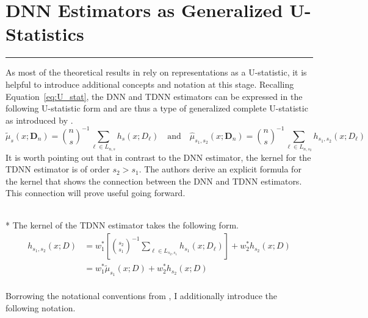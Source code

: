 \section{DNN Estimators as Generalized U-Statistics}\label{sec:U_stat}
\hrule

As most of the theoretical results in \citet{demirkaya_optimal_2024} rely on representations as a U-statistic, it is helpful to introduce additional concepts and notation at this stage.
Recalling Equation~\ref{eq:U_stat}, the DNN and TDNN estimators can be expressed in the following U-statistic form and are thus a type of generalized complete U-statistic as introduced by \citet{peng_rates_2022}.
\begin{equation}
	\tilde{\mu}_{s}(x; \mathbf{D}_n)
	= \binom{n}{s}^{-1} \sum_{\ell \in L_{n,s}} h_{s}(x; D_{\ell})
	\quad \text{and} \quad
	\hat{\mu}_{s_1, s_2}(x; \mathbf{D}_n)
	= \binom{n}{s}^{-1} \sum_{\ell \in L_{n,s_2}} h_{s_1, s_2}(x; D_{\ell})
\end{equation}
It is worth pointing out that in contrast to the DNN estimator, the kernel for the TDNN estimator is of order $s_2 > s_1$.
The authors derive an explicit formula for the kernel that shows the connection between the DNN and TDNN estimators.
This connection will prove useful going forward.
\begin{boxD}
	\begin{lem}\label{lem:dem8}\mbox{}\\*
		The kernel of the TDNN estimator takes the following form.
		\begin{equation}
			\begin{aligned}
				h_{s_1, s_2}\left(x; D\right)
				 & = w_{1}^{*}\left[\binom{s_2}{s_1}^{-1}\sum_{\ell \in L_{s_2, s_1}} h_{s_1}\left(x; D_{\ell}\right)\right] + w_{2}^{*} h_{s_2}\left(x; D\right) \\
				 & = w_{1}^{*} \tilde{\mu}_{s_1}\left(x; D\right) + w_{2}^{*} h_{s_2}\left(x; D\right)                                                            \\
			\end{aligned}
		\end{equation}
	\end{lem}
\end{boxD}
Borrowing the notational conventions from \citet{lee_u-statistics_2019}, I additionally introduce the following notation.

